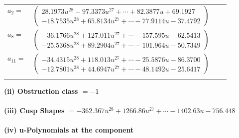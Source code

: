 \documentclass[1p]{elsarticle_modified}
\theoremstyle{definition}
\begin{document}
\begin{tabular}{m{7pt} m{180pt} m{7pt} m{180pt} }
\flushright $a_{2}=$&$\begin{pmatrix}28.1973 u^{28}-97.3373 u^{27}+\cdots+82.3877 u+69.1927\\-18.7535 u^{28}+65.8134 u^{27}+\cdots-77.9114 u-37.4792\end{pmatrix}$ \\
\flushright $a_{8}=$&$\begin{pmatrix}-36.1766 u^{28}+127.011 u^{27}+\cdots-157.595 u-62.5413\\-25.5368 u^{28}+89.2904 u^{27}+\cdots-101.964 u-50.7349\end{pmatrix}$ \\
\flushright $a_{11}=$&$\begin{pmatrix}-34.4315 u^{28}+118.013 u^{27}+\cdots-25.5876 u-86.3700\\-12.7801 u^{28}+44.6947 u^{27}+\cdots-48.1492 u-25.6417\end{pmatrix}$\\&\end{tabular}
\flushleft \textbf{(ii) Obstruction class $= -1$}\\~\\
\flushleft \textbf{(iii) Cusp Shapes $= -362.367 u^{28}+1266.86 u^{27}+\cdots-1402.63 u-756.448$}\\~\\
\newpage\renewcommand{\arraystretch}{1}
\flushleft \textbf{(iv) u-Polynomials at the component}\newline \\
\end{document}
